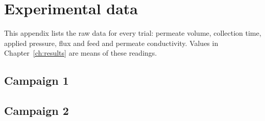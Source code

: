 \chapter{Experimental data}
\label{app:data}

This appendix lists the raw data for every trial: permeate volume, collection time, applied pressure, flux and feed and permeate conductivity. Values in Chapter~\ref{ch:results} are means of these readings.

\section{Campaign 1}
\label{app:data-c1}

\section{Campaign 2}
\label{app:data-c2}
